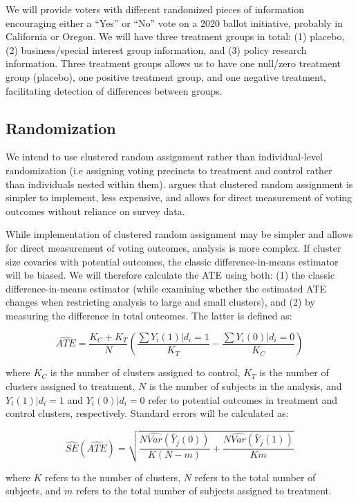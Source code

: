 \documentclass[12pt,final,fleqn]{article}
\theoremstyle{plain}
\begin{document}
We will provide voters with different randomized pieces of information encouraging either a ``Yes'' or ``No'' vote on a 2020 ballot initiative, probably in California or Oregon. We will have three treatment groups in total: (1) placebo, (2) business/special interest group information, and (3) policy research information. Three treatment groups  allows us to have one null/zero treatment group (placebo), one positive treatment group, and one negative treatment, facilitating detection of differences between groups.

\subsection{Randomization} \label{sec: treatment_groups}

We intend to use clustered random assignment rather than individual-level randomization (i.e assigning voting precincts to treatment and control rather than individuals nested within them). \citet{arceneaux2005using} argues that clustered random assignment is simpler to implement, less expensive, and allows for direct measurement of voting outcomes without reliance on survey data.

While implementation of clustered random assignment may be simpler and allows for direct measurement of voting outcomes, analysis is more complex. If cluster size covaries with potential outcomes, the classic difference-in-means estimator will be biased. We will therefore calculate the ATE using both: (1) the classic difference-in-means estimator (while examining whether the estimated ATE changes when restricting analysis to large and small clusters), and (2) by measuring the difference in total outcomes. The latter is defined as:

$$\hat{ATE} = \frac{K_C + K_T}{N}\left(\frac{\sum Y_i(1)|d_i = 1}{K_T} - \frac{\sum Y_i(0)|d_i = 0}{K_C}\right)$$

\noindent
where $K_C$ is the number of clusters assigned to control, $K_T$ is the number of clusters assigned to treatment, $N$ is the number of subjects in the analysis, and $Y_i(1)|d_i = 1$ and $Y_i(0)|d_i = 0$ refer to potential outcomes in treatment and control clusters, respectively. Standard errors will be calculated as:

$$ \hat{SE}({\hat{ATE}}) = \sqrt{\frac{N\hat{Var}(\bar{Y}_j(0))}{K(N-m)} + \frac{N\hat{Var}(\bar{Y}_j(1))}{{Km}}} $$

\noindent
where $K$ refers to the number of clusters, $N$ refers to the total number of subjects, and $m$ refers to the total number of subjects assigned to treatment. 
\end{document}
